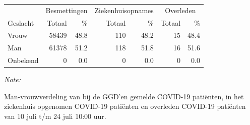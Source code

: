 \documentclass[
  english,
  man,floatsintext]{apa6}
\begin{document}
\begin{table}
\centering\begingroup\fontsize{11}{13}\selectfont

\begin{threeparttable}
\begin{tabular}{lrrrrrr}
\toprule
\multicolumn{1}{c}{ } & \multicolumn{2}{c}{Besmettingen} & \multicolumn{2}{c}{Ziekenhuisopnames} & \multicolumn{2}{c}{Overleden} \\
\cmidrule(l{3pt}r{3pt}){2-3} \cmidrule(l{3pt}r{3pt}){4-5} \cmidrule(l{3pt}r{3pt}){6-7}
Geslacht & Totaal & \% & Totaal & \% & Totaal & \%\\
\midrule
Vrouw & 58439 & 48.8 & 110 & 48.2 & 15 & 48.4\\
Man & 61378 & 51.2 & 118 & 51.8 & 16 & 51.6\\
Onbekend & 0 & 0.0 & 0 & 0.0 & 0 & 0.0\\
\bottomrule
\end{tabular}
\begin{tablenotes}
\item \textit{Note: } 
\item Man-vrouwverdeling van bij de GGD’en gemelde COVID-19 patiënten, in het ziekenhuis opgenomen COVID-19 patiënten en overleden COVID-19 patiënten van 10 juli t/m 24 juli 10:00 uur.
\end{tablenotes}
\end{threeparttable}
\endgroup{}
\end{table}
\newpage
\end{document}
